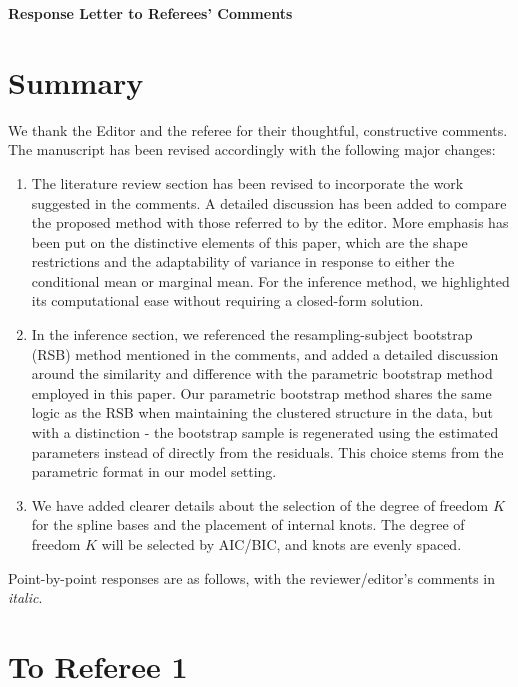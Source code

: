 \documentclass[12pt]{article}
\begin{document}
\begin{center}
  {\Large\bf Response Letter to Referees' Comments}
\end{center}


\section{Summary}

We thank the Editor and the referee for their thoughtful, constructive
comments. The manuscript has been revised accordingly with the
following major changes:

\begin{enumerate}
\item
The literature review section has been revised to incorporate the work
suggested in the comments. A detailed discussion has been added to
compare the proposed method with those referred to by the editor. More
emphasis has been put on the distinctive elements of this paper, which
are the shape restrictions and the adaptability of variance in
response to either the conditional mean or marginal mean. For the
inference method, we highlighted its computational ease without
requiring a closed-form solution.
  
\item
  In the inference section, we referenced the resampling-subject
  bootstrap (RSB) method mentioned in the comments, and added a
  detailed discussion around the similarity and difference with the
  parametric bootstrap method employed in this paper. Our parametric
  bootstrap method shares the same logic as the RSB when maintaining
  the clustered structure in the data, but with a distinction -  the
  bootstrap sample is regenerated using the estimated parameters
  instead of directly from the residuals. This choice stems from
  the parametric format in our model setting.

\item
  We have added clearer details about the selection of the degree of
  freedom $K$ for the spline bases and the placement of internal
  knots. The degree of freedom $K$ will be  selected by AIC/BIC, and
  knots are evenly spaced.
\end{enumerate}


Point-by-point responses are as follows, with the reviewer/editor's comments in {\it italic}.


\section{To Referee 1}
\end{document}
